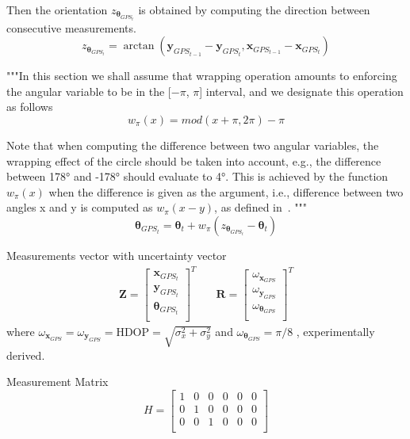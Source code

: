 Then the orientation $z_{\boldsymbol \theta_{GPS_t}}$ is obtained by computing the direction between consecutive measurements.
\begin{equation}
z_{\boldsymbol \theta_{GPS_t}} = \arctan(\mathbf{y}_{GPS_{t-1}} - \mathbf{y}_{GPS_t}, \mathbf{x}_{GPS_{t-1}} - \mathbf{x}_{GPS_t} )
\end{equation}

"""In this section we shall assume that wrapping operation
amounts to enforcing the angular variable to be in the [$-\pi$, $\pi$]
interval, and we designate this operation as follows
\begin{equation}
w_{\pi}(x) = mod(x + \pi, 2\pi) - \pi
\end{equation}

Note that when computing the difference between two angular
variables, the wrapping effect of the circle should be taken into
account, e.g., the difference between 178° and -178° should
evaluate to 4°. This is achieved by the function $w_{\pi}(x)$ when the difference
is given as the argument, i.e., difference between two angles
x and y is computed as $w_{\pi}(x-y)$, as defined in~\cite{markovic_wrapping_2017}.
"""
\begin{equation}
	\boldsymbol \theta_{GPS_t} = \boldsymbol \theta_{t} + w_{\pi}(z_{\boldsymbol \theta_{GPS_t}} - \boldsymbol \theta_{t})
\end{equation}

Measurements vector with uncertainty vector
\begin{align}
\mathbf{Z}
=
\begin{bmatrix}
\mathbf{x}_{GPS_t} \\
\mathbf{y}_{GPS_t} \\
\boldsymbol \theta_{GPS_t} \\
\end{bmatrix}^T
& \quad
\mathbf{R}
=
\begin{bmatrix}
\omega_{\mathbf{x}_{GPS}} \\
\omega_{\mathbf{y}_{GPS}} \\
\omega_{\boldsymbol \theta_{GPS}} \\
\end{bmatrix}^T
\end{align}
where $ \omega_{\mathbf{x}_{GPS}} = \omega_{\mathbf{y}_{GPS}} = \text{HDOP} = \sqrt{\sigma_x^2 + \sigma_y^2}$ and
$ \omega_{\boldsymbol \theta_{GPS}} = \pi/8 $ , experimentally derived.

Measurement Matrix
\begin{equation}
H
=
\begin{bmatrix}
1 & 0 & 0 & 0 & 0 & 0 \\
0 & 1 & 0 & 0 & 0 & 0 \\
0 & 0 & 1 & 0 & 0 & 0 \\
\end{bmatrix}
\end{equation}


